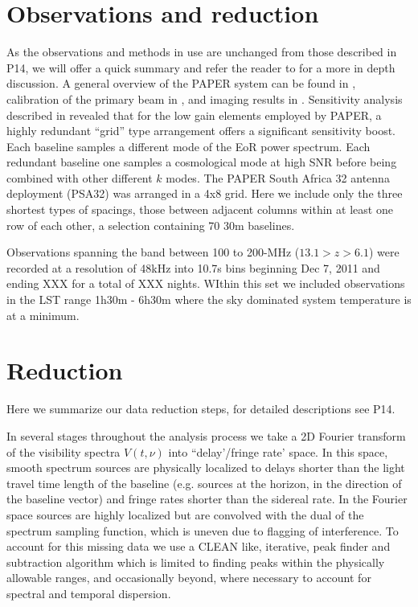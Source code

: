 \documentclass[preprint]{aastex}
\begin{document}

\section{Observations and reduction}
As the observations and methods in use are unchanged from those described in P14, we will offer a quick summary and refer the reader to \cite{Parsons:2013p9876} for a more in depth discussion.  A general overview of the PAPER system can be found in \cite{Parsons:2010p6757}, calibration of the primary beam in \cite{Pober:2012p8800}, and imaging results in \cite{Jacobs:2011p8438,Jacobs:2013p10014,Stefan:2013p9926}.  Sensitivity analysis described in \cite{Parsons:2012p9028} revealed that for the low gain elements employed by PAPER, a highly redundant ``grid'' type arrangement offers a significant sensitivity boost.  Each baseline samples a different mode of the EoR power spectrum. Each redundant baseline one samples a cosmological mode at high SNR before being combined with other different $k$ modes.  The PAPER South Africa 32 antenna deployment (PSA32) was arranged in a 4x8 grid.  Here we include only the three shortest types of spacings, those between adjacent columns within at least one row of each other, a selection containing 70 30m baselines.

Observations spanning the band between 100 to 200-MHz ($13.1>z>6.1$) were recorded at a resolution of 48kHz into 10.7s bins beginning Dec 7, 2011 and ending XXX for a total of XXX nights.  WIthin this set we included observations in the LST range 1h30m - 6h30m where the sky dominated system temperature is at a minimum.  


\section{Reduction}
Here we summarize our data reduction steps, for detailed descriptions see P14.

In several stages throughout the analysis process we take a 2D Fourier transform of the visibility spectra $V(t,\nu)$ into ``delay'/fringe rate' space.  In this space, smooth spectrum sources are physically localized to delays shorter than the light travel time length of the baseline (e.g. sources at the horizon, in the direction of the baseline vector) and fringe rates shorter than the sidereal rate.  In the Fourier space sources are highly localized but are convolved with the dual of the spectrum sampling function, which is uneven due to flagging of interference.  To account for this missing data we use a CLEAN like, iterative, peak finder and subtraction algorithm which is limited to finding peaks within the physically allowable ranges, and occasionally beyond, where necessary to account for spectral and temporal dispersion. 
\end{document}
